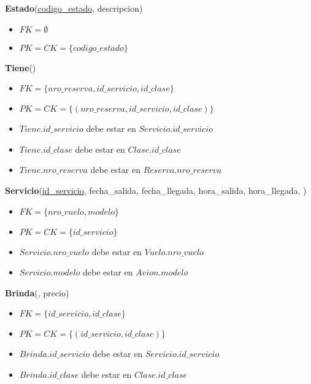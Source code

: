 \vspace*{0.1cm}
\noindent
\textbf{Estado}(\underline{codigo\_estado}, descripcion)
\begin{itemize}[noitemsep]
	\item $FK = \emptyset$
	\item $PK = CK = \{codigo\_estado\}$
\end{itemize}

\vspace*{0.1cm}
\noindent
\textbf{Tiene}(\underline{})
\begin{itemize}[noitemsep]
	\item $FK = \{nro\_reserva, id\_servicio, id\_clase\}$
	\item $PK = CK = \{(nro\_reserva, id\_servicio, id\_clase)\}$
	\item $Tiene.id\_servicio$ debe estar en $Servicio.id\_servicio$
	\item $Tiene.id\_clase$ debe estar en $Clase.id\_clase$
	\item $Tiene.nro\_reserva$ debe estar en $Reserva.nro\_reserva$
\end{itemize}

\vspace*{0.1cm}
\noindent
\textbf{Servicio}(\underline{id\_servicio}, fecha\_salida, fecha\_llegada,
		hora\_salida, hora\_llegada, )
\begin{itemize}[noitemsep]
	\item $FK = \{nro\_vuelo, modelo\}$
	\item $PK = CK = \{id\_servicio\}$
	\item $Servicio.nro\_vuelo$ debe estar en $Vuelo.nro\_vuelo$
	\item $Servicio.modelo$ debe estar en $Avion.modelo$
\end{itemize}

\vspace*{0.1cm}
\noindent
\textbf{Brinda}(\underline{}, precio)
\begin{itemize}[noitemsep]
	\item $FK = \{id\_servicio, id\_clase\}$
	\item $PK = CK = \{(id\_servicio, id\_clase)\}$
	\item $Brinda.id\_servicio$ debe estar en $Servicio.id\_servicio$
	\item $Brinda.id\_clase$ debe estar en $Clase.id\_clase$
\end{itemize}

